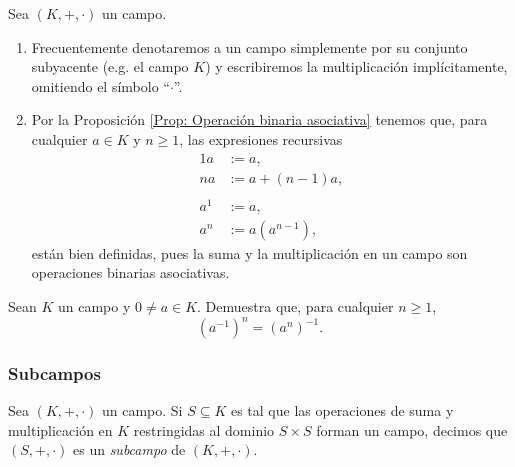 \documentclass[notasLineal]{subfiles}
\begin{document}

\begin{Nota}\label{Nota: Campo}

    Sea $(K,+,\cdot)$ un campo.

    \begin{enumerate}[label=(\alph*)]
    
        \item Frecuentemente denotaremos a un campo simplemente por su conjunto subyacente (e.g. el campo $K$) y escribiremos la multiplicación implícitamente, omitiendo el símbolo ``$\cdot$''.
            
        \item Por la Proposición \ref{Prop: Operación binaria asociativa} tenemos que, para cualquier $a\in K$ y $n\ge 1$, las expresiones recursivas
            \begin{align*}
                1a &:= a, \\
                na &:= a + (n-1)a, \\ \\
                a^1&:= a, \\
                a^n &:= a(a^{n-1}),
            \end{align*}
            están bien definidas, pues la suma y la multiplicación en un campo son operaciones binarias asociativas.
    \end{enumerate}
\end{Nota}

\begin{Ejer}[]\label{Ejer: Notación multiplicativa e inversos}
    Sean $K$ un campo y $0\neq a\in K$. Demuestra que, para cualquier $n\ge 1$, $$(a^{-1})^n = (a^n)^{-1}.$$
\end{Ejer}

\subsubsection*{Subcampos} \label{Sssec: Subcampos}

\begin{tcolorbox}
    \begin{Def}\label{Def: Subcampo}
        Sea $(K,+,\cdot)$ un campo. Si $S\subseteq K$ es tal que las operaciones de suma y multiplicación en $K$ restringidas al dominio $S\times S$ forman un campo, decimos que $(S,+,\cdot)$ es un \emph{subcampo} de $(K,+,\cdot)$.
    \end{Def}
\end{tcolorbox}
\end{document}
